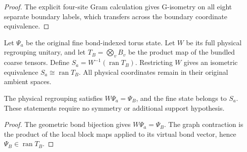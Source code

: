 \begin{proof}\leanok
    The explicit four-site Gram calculation gives G-isometry on all eight
    separate boundary labels, which transfers across the boundary
    coordinate equivalence.
\end{proof}

\begin{definition}%
    \label{def:peps_two_by_two_fine_support}
    \leanok
    Let $\Psi_a$ be the original fine bond-indexed torus state. Let $W$
    be its full physical regrouping unitary, and let $T_B=\bigotimes_vB_v$
    be the product map of the bundled coarse tensors. Define
    $S_a=W^{-1}(\operatorname{ran}T_B)$. Restricting $W$ gives an isometric
    equivalence $S_a\cong\operatorname{ran}T_B$. All physical coordinates
    remain in their original ambient spaces.
\end{definition}

\begin{lemma}%
    \label{thm:peps_two_by_two_fine_support}
    \leanok
    The physical regrouping satisfies $W\Psi_a=\Psi_B$, and the
    fine state belongs to $S_a$. These statements require no symmetry or
    additional support hypothesis.
\end{lemma}

\begin{proof}\leanok
    The geometric bond bijection gives $W\Psi_a=\Psi_B$.
    The graph contraction is the product of the local block maps applied
    to its virtual bond vector, hence $\Psi_B\in\operatorname{ran}T_B$.
\end{proof}

